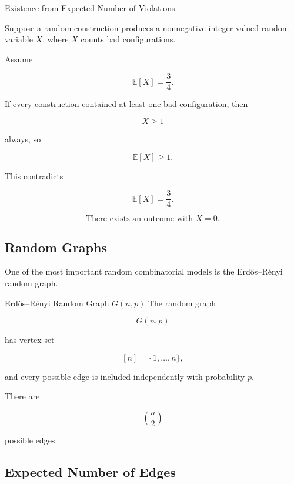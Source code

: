 \begin{workedexamplebox}{Existence from Expected Number of Violations}

Suppose a random construction produces a nonnegative integer-valued
random variable \(X\), where \(X\) counts bad configurations.

Assume

\[
\mathbb{E}[X]
=
\frac34.
\]

If every construction contained at least one bad configuration, then

\[
X\geq1
\]

always, so

\[
\mathbb{E}[X]\geq1.
\]

This contradicts

\[
\mathbb{E}[X]=\frac34.
\]

\begin{answerbox}
\[
\boxed{
\text{There exists an outcome with }X=0.
}
\]
\end{answerbox}

\end{workedexamplebox}

\subsection{Random Graphs}
\label{subsec:random-graphs}

One of the most important random combinatorial models is the
Erd\H{o}s--R\'enyi random graph.

\begin{definitionbox}{Erd\H{o}s--R\'enyi Random Graph \(G(n,p)\)}
The random graph

\[
G(n,p)
\]

has vertex set

\[
[n]=\{1,\ldots,n\},
\]

and every possible edge is included independently with probability
\(p\).
\end{definitionbox}

There are

\[
\binom{n}{2}
\]

possible edges.

\subsection{Expected Number of Edges}
\label{subsec:expected-edges-random-graph}

